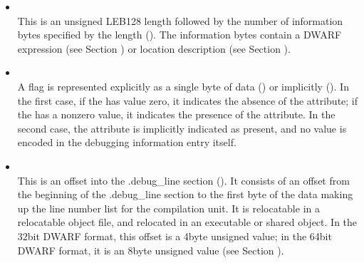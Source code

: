 \begin{itemize}
The data in , 
, 
 and
can be anything. Depending on context, it may
be a signed integer, an unsigned integer, a floating\dash point
constant, or anything else. A consumer must use context to
know how to interpret the bits, which if they are target
machine data (such as an integer or floating point constant)
will be in target machine byte\dash order.

\textit{If one of the <n> forms is used to represent a
signed or unsigned integer, it can be hard for a consumer
to discover the context necessary to determine which
interpretation is intended. Producers are therefore strongly
encouraged to use  or 
 for signed and
unsigned integers respectively, rather than 
 \textless n \textgreater.}


\item {} \\
This is an unsigned LEB128 length followed by the
number of information bytes specified by the length
(). 
The information bytes contain a DWARF
expression 
(see Section ) 
or location description 
(see Section ).

\item {} \\
A flag is represented explicitly as a single byte of data
() or 
implicitly (). 
In the
first case, if the  has value zero, it indicates the
absence of the attribute; if the  has a non\dash zero value,
it indicates the presence of the attribute. In the second
case, the attribute is implicitly indicated as present, and
no value is encoded in the debugging information entry itself.

\item {} \\
This is an offset into the .debug\_line section
(). It consists of an offset from the
beginning of the .debug\_line section to the first byte of
the data making up the line number list for the compilation
unit. 
It is relocatable in a relocatable object file, and
relocated in an executable or shared object. In the 32\dash bit
DWARF format, this offset is a 4\dash byte unsigned value;
in the 64\dash bit DWARF format, it is an 8\dash byte unsigned value
(see Section ).



\end{itemize}
